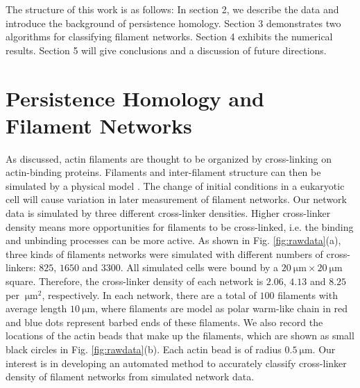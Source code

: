 \documentclass[10pt]{article}
\begin{document}
The structure of this work is as follows: In section 2, we describe the data and introduce the background of persistence homology. Section 3 demonstrates two algorithms for classifying filament networks. Section 4 exhibits the numerical results. Section 5 will give conclusions and a discussion of future directions.


\section{Persistence Homology and Filament Networks}
As discussed, actin filaments are thought to be organized by cross-linking on actin-binding proteins. Filaments and inter-filament structure can then be simulated by a physical model \cite{freedman2017versatile,freedman2018nonequilibrium}. The change of initial conditions in a eukaryotic cell will cause variation in later measurement of filament networks. Our network data is simulated by three different cross-linker densities. Higher cross-linker density means more opportunities for filaments to be cross-linked, i.e. the binding and unbinding processes can be more active. As shown in Fig. \ref{fig:rawdata}(a), three kinds of filaments networks were simulated with different numbers of cross-linkers:  $825$, $1650$ and $3300$. All simulated cells were bound by a $\SI{20}{\micro\metre} \times \SI{20}{\micro\metre}$ square. Therefore, the cross-linker density of each network is $2.06$, $4.13$ and $8.25$ per $\SI{}{\micro\metre}^2$, respectively. In each network, there are a total of $100$ filaments with average length $\SI{10}{\micro\metre}$, where filaments are model as polar warm-like chain in red and blue dots represent barbed ends of these filaments. We also record the locations of the actin beads that make up the filaments, which are shown as small black circles in Fig. \ref{fig:rawdata}(b). Each actin bead is of radius $\SI{0.5}{\micro\metre}$. Our interest is in developing an automated method to accurately classify cross-linker density of filament networks from simulated network data.
\end{document}
